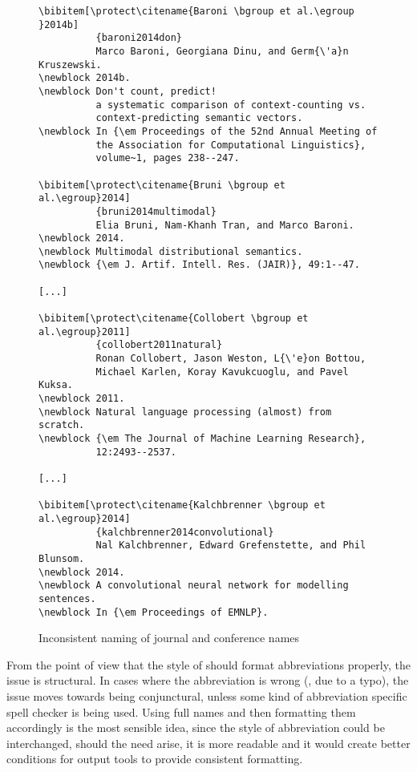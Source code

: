 \begin{figure}
  \centering
\begin{small}
\begin{verbatim}
\bibitem[\protect\citename{Baroni \bgroup et al.\egroup }2014b]
          {baroni2014don}
          Marco Baroni, Georgiana Dinu, and Germ{\'a}n Kruszewski.
\newblock 2014b.
\newblock Don't count, predict!
          a systematic comparison of context-counting vs.
          context-predicting semantic vectors.
\newblock In {\em Proceedings of the 52nd Annual Meeting of
          the Association for Computational Linguistics},
          volume~1, pages 238--247.

\bibitem[\protect\citename{Bruni \bgroup et al.\egroup}2014]
          {bruni2014multimodal}
          Elia Bruni, Nam-Khanh Tran, and Marco Baroni.
\newblock 2014.
\newblock Multimodal distributional semantics.
\newblock {\em J. Artif. Intell. Res. (JAIR)}, 49:1--47.

[...]

\bibitem[\protect\citename{Collobert \bgroup et al.\egroup}2011]
          {collobert2011natural}
          Ronan Collobert, Jason Weston, L{\'e}on Bottou,
          Michael Karlen, Koray Kavukcuoglu, and Pavel Kuksa.
\newblock 2011.
\newblock Natural language processing (almost) from scratch.
\newblock {\em The Journal of Machine Learning Research},
          12:2493--2537.

[...]

\bibitem[\protect\citename{Kalchbrenner \bgroup et al.\egroup}2014]
          {kalchbrenner2014convolutional}
          Nal Kalchbrenner, Edward Grefenstette, and Phil Blunsom.
\newblock 2014.
\newblock A convolutional neural network for modelling sentences.
\newblock In {\em Proceedings of EMNLP}.
\end{verbatim}
\end{small}
  \caption{Inconsistent naming of journal and conference names}
\label{fig:inconsistent_naming}
\end{figure}

From the point of view that the style of {\bibtex} should format
abbreviations properly, the issue is structural.  In cases where the
abbreviation is wrong (\eg, due to a typo), the issue moves towards
being conjunctural, unless some kind of abbreviation specific spell
checker is being used.  Using full names and then formatting them
accordingly is the most sensible idea, since the style of abbreviation
could be interchanged, should the need arise, it is more readable and
it would create better conditions for output tools to provide
consistent formatting.


